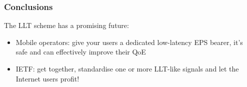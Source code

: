 \begin{frame}
\frametitle{Conclusions}

The LLT scheme has a promising future:

\begin{itemize}
\item Mobile operators: give your users a dedicated low-latency EPS bearer, it's safe and can effectively improve their QoE
\item IETF: get together, standardise one or more LLT-like signals and let the Internet users profit!
\end{itemize}

\end{frame}
